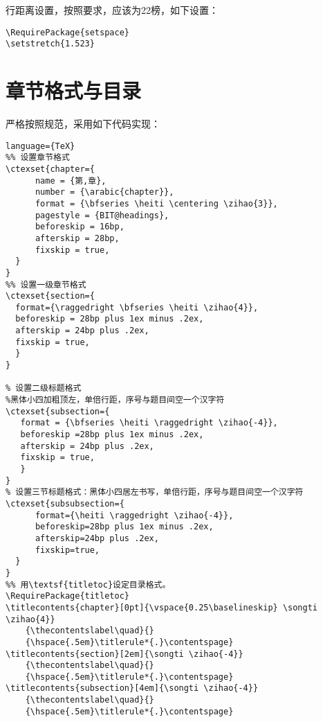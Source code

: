 行距离设置，按照要求，应该为22榜，如下设置：
\begin{lstlisting}[language={[LaTeX]TeX}]
\RequirePackage{setspace}
\setstretch{1.523} 
\end{lstlisting}

\section{章节格式与目录}
严格按照规范，采用如下代码实现：
\begin{lstlisting}language={TeX}
%% 设置章节格式
\ctexset{chapter={
      name = {第,章},
      number = {\arabic{chapter}},
      format = {\bfseries \heiti \centering \zihao{3}},
      pagestyle = {BIT@headings},
      beforeskip = 16bp,
      afterskip = 28bp,
      fixskip = true,
  }
}
%% 设置一级章节格式
\ctexset{section={
  format={\raggedright \bfseries \heiti \zihao{4}},
  beforeskip = 28bp plus 1ex minus .2ex,
  afterskip = 24bp plus .2ex,
  fixskip = true,
  }
}

% 设置二级标题格式
%黑体小四加粗顶左，单倍行距，序号与题目间空一个汉字符
\ctexset{subsection={
   format = {\bfseries \heiti \raggedright \zihao{-4}},
   beforeskip =28bp plus 1ex minus .2ex,
   afterskip = 24bp plus .2ex,
   fixskip = true,
   }
}
% 设置三节标题格式：黑体小四居左书写，单倍行距，序号与题目间空一个汉字符
\ctexset{subsubsection={
      format={\heiti \raggedright \zihao{-4}},
      beforeskip=28bp plus 1ex minus .2ex,
      afterskip=24bp plus .2ex,
      fixskip=true,
  }
}
%% 用\textsf{titletoc}设定目录格式。
\RequirePackage{titletoc}
\titlecontents{chapter}[0pt]{\vspace{0.25\baselineskip} \songti \zihao{4}}
    {\thecontentslabel\quad}{}
    {\hspace{.5em}\titlerule*{.}\contentspage}
\titlecontents{section}[2em]{\songti \zihao{-4}}
    {\thecontentslabel\quad}{}
    {\hspace{.5em}\titlerule*{.}\contentspage}
\titlecontents{subsection}[4em]{\songti \zihao{-4}}
    {\thecontentslabel\quad}{}
    {\hspace{.5em}\titlerule*{.}\contentspage}
    
\end{lstlisting}

